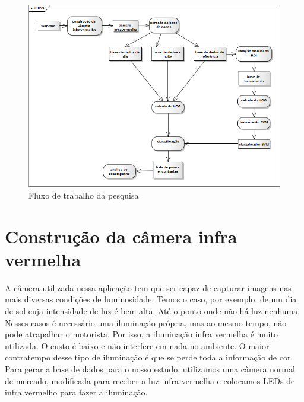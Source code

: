 \begin{figure}[ht!]
	\centering
  	\includegraphics[scale=0.6]{image/HOG.png}
  	\caption{Fluxo de trabalho da pesquisa}
  	\label{fig:research_steps}
\end{figure}

\section{Construção da câmera infra vermelha}

A câmera utilizada nessa aplicação tem que ser capaz de capturar imagens nas mais diversas condições de luminosidade. Temos o caso, por exemplo, de um dia de sol cuja intensidade de luz é bem alta. Até o ponto onde não há luz nenhuma.
Nesses casos é necessário uma iluminação própria, mas ao mesmo tempo, não pode atrapalhar o motorista. Por isso, a iluminação infra vermelha é muito utilizada. O custo é baixo e não interfere em nada no ambiente. O maior contratempo desse tipo de iluminação é que se perde toda a informação de cor.
Para gerar a base de dados para o nosso estudo, utilizamos uma câmera normal de mercado, modificada para receber a luz infra vermelha e colocamos LEDs de infra vermelho para fazer a iluminação.

